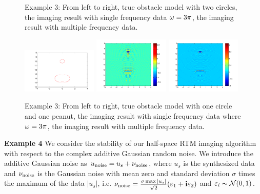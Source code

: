 \documentclass[12pt]{iopart}
\begin{document}
{\begin{figure}
	\caption{Example 3: From left to right,  true obstacle model with two circles, the imaging result
		with single frequency data $\omega=3\pi$, the imaging result with multiple frequency data.}\label{figure_31}
\end{figure}

\begin{figure}
	\centering
	\includegraphics[width=0.32\textwidth,height=0.16\textheight]{./graphic/circle_0_4_peanut_1_profile-eps-converted-to.pdf}
	\includegraphics[width=0.32\textwidth]{./graphic/circle_0_4_peanut_1_3pi_1-eps-converted-to.pdf}
	\includegraphics[width=0.32\textwidth]{./graphic/circle_0_4_peanut_1_multi_1-eps-converted-to.pdf}
	
	\caption{Example 3: From left to right,  true obstacle model with one circle and one peanut, the imaging result
		with single frequency data where $\omega=3\pi$, the imaging result with multiple frequency data.}\label{figure_32}
\end{figure}

\bigskip
\textbf{Example 4}
We consider the stability of our half-space RTM imaging
algorithm with respect to the complex additive Gaussian random noise. We introduce
the additive Gaussian noise as $u_{\rm noise}=u_s+\nu_{\rm noise}$,
where $u_s$ is the synthesized data and $\nu_{\rm noise}$ is the Gaussian noise with mean zero and standard deviation $\sigma$ times the maximum of  the data $|u_s|$, i.e. $\nu_{\rm noise}=\frac{\sigma \max |u_s|}{\sqrt{2}}(\varepsilon_1+\mathbf{i}\varepsilon_2)$ and $\varepsilon_i\thicksim \mathcal{N}(0,1)$.

}
\end{document}

